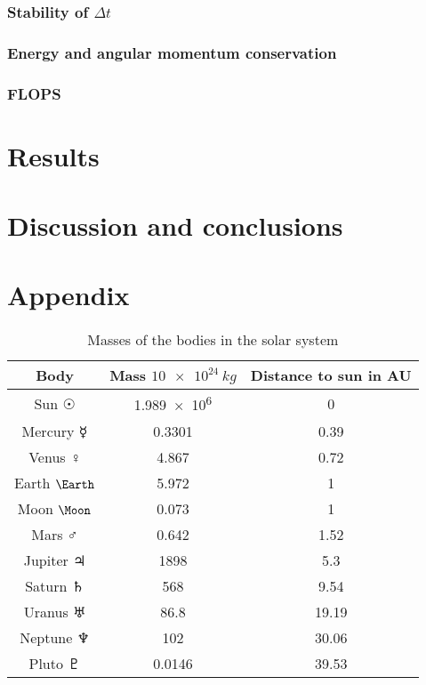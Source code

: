 \documentclass[10pt]{article}
\begin{document}
\begin{multicols}{2}
\subsubsection{Stability of \texorpdfstring{$\Delta t$}{}}
\subsubsection{Energy and angular momentum conservation}
\subsubsection{FLOPS}

\section{Results}

\section{Discussion and conclusions}
\section*{Appendix}
\begin{table}[H]
    \caption{Masses of the bodies in the solar system}
    \centering
    \begin{tabular}{| c | c | c | }
        \hline
        Body & Mass $\SI{10e24}{kg}$ & Distance to sun in AU\\
        \hline
        Sun      $\Sun$   & \SI{1.989e6}{}&  0 \\
        Mercury  $\Mercury$ & 0.3301    &  0.39 \\
        Venus    $\Venus$   & 4.867     &  0.72 \\
        Earth    $\Earth$   & 5.972     &  1 \\
        Moon     $\Moon$    & 0.073     &  1 \\
        Mars     $\Mars$    & 0.642     &  1.52 \\
        Jupiter  $\Jupiter$ & 1898      &  5.3 \\
        Saturn   $\Saturn$  & 568       &  9.54 \\
        Uranus   $\Uranus$  & 86.8      & 19.19 \\
        Neptune  $\Neptune$ & 102       & 30.06 \\
        Pluto    $\Pluto$   & 0.0146    & 39.53 \\
        \hline
    \end{tabular}
    \label{tab:CelestialMasses}
\end{table}


{}


\end{multicols}
\end{document}

